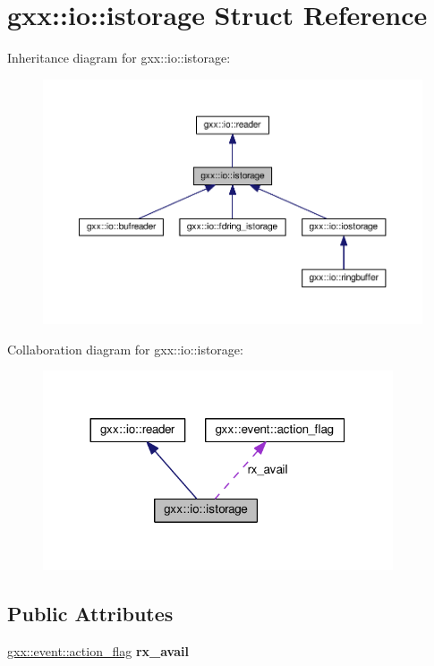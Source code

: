 \hypertarget{structgxx_1_1io_1_1istorage}{}\section{gxx\+:\+:io\+:\+:istorage Struct Reference}
\label{structgxx_1_1io_1_1istorage}


Inheritance diagram for gxx\+:\+:io\+:\+:istorage\+:
\nopagebreak
\begin{figure}[H]
\begin{center}
\leavevmode
\includegraphics[width=350pt]{structgxx_1_1io_1_1istorage__inherit__graph}
\end{center}
\end{figure}


Collaboration diagram for gxx\+:\+:io\+:\+:istorage\+:
\nopagebreak
\begin{figure}[H]
\begin{center}
\leavevmode
\includegraphics[width=293pt]{structgxx_1_1io_1_1istorage__coll__graph}
\end{center}
\end{figure}
\subsection*{Public Attributes}
\begin{DoxyCompactItemize}
\item 
\hyperlink{classgxx_1_1event_1_1action__flag}{gxx\+::event\+::action\+\_\+flag} {\bfseries rx\+\_\+avail}\hypertarget{structgxx_1_1io_1_1istorage_af3f03ec693efe3f4c5462c5efb3d271e}{}\label{structgxx_1_1io_1_1istorage_af3f03ec693efe3f4c5462c5efb3d271e}

\end{DoxyCompactItemize}
